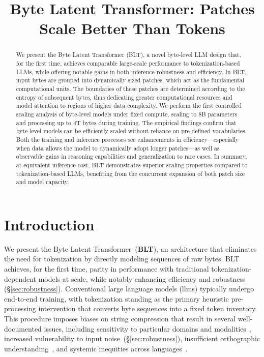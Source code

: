 \title{Byte Latent Transformer: Patches Scale Better Than Tokens}

\begin{abstract}
We present the Byte Latent Transformer ({\textsc BLT}), a novel byte-level LLM design that, for the first time, achieves comparable large-scale performance to tokenization-based LLMs, while offering notable gains in both inference robustness and efficiency. In {\textsc BLT}, input bytes are grouped into dynamically sized patches, which act as the fundamental computational units. The boundaries of these patches are determined according to the entropy of subsequent bytes, thus dedicating greater computational resources and model attention to regions of higher data complexity. We perform the first controlled scaling analysis of byte-level models under fixed compute, scaling to 8B parameters and processing up to 4T bytes during training. The empirical findings confirm that byte-level models can be efficiently scaled without reliance on pre-defined vocabularies. Both the training and inference processes see enhancements in efficiency—especially when data allows the model to dynamically adopt longer patches—as well as observable gains in reasoning capabilities and generalization to rare cases. In summary, at equivalent inference cost, {\textsc BLT} demonstrates superior scaling properties compared to tokenization-based LLMs, benefiting from the concurrent expansion of both patch size and model capacity.
\end{abstract}

\section{Introduction}
\label{section:intro}

We present the Byte Latent Transformer~(\textbf{BLT}), an architecture that eliminates the need for tokenization by directly modeling sequences of raw bytes. BLT achieves, for the first time, parity in performance with traditional tokenization-dependent models at scale, while notably enhancing efficiency and robustness (\S\ref{sec:robustness}).
Conventional large language models (llms) typically undergo end-to-end training, with tokenization standing as the primary heuristic pre-processing intervention that converts byte sequences into a fixed token inventory. This procedure imposes biases on string compression that result in several well-documented issues, including sensitivity to particular domains and modalities~\citep{dagangetting}, increased vulnerability to input noise~(\S\ref{sec:robustness}), insufficient orthographic understanding~\citep{edman2024cute}, and systemic inequities across languages~\citep{liang2023xlm,petrov2024language,limisiewicz2024myte}.

